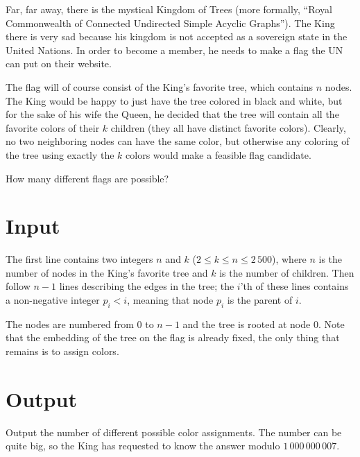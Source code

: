 
%
\noindent
Far, far away, there is the mystical Kingdom of Trees (more formally, ``Royal Commonwealth of Connected Undirected Simple Acyclic Graphs''). The King there is very sad because his kingdom is not accepted as a sovereign state in the United Nations. In order to become a member, he needs to make a flag the UN can put on their website.

The flag will of course consist of the King's favorite tree, which contains $n$ nodes. The King would be happy to just have the tree colored in black and white, but for the sake of his wife the Queen, he decided that the tree will contain all the favorite colors of their $k$ children (they all have distinct favorite colors). Clearly, no two neighboring nodes can have the same color, but otherwise any coloring of the tree using exactly the $k$ colors would make a feasible flag candidate.

How many different flags are possible?

\section*{Input}

The first line contains two integers $n$ and $k$ ($2 \le k \le n \le 2\,500$), where $n$ is the number of nodes in the King's favorite tree and $k$ is the number of children. Then follow $n-1$ lines describing the edges in the tree; the $i$'th of these lines contains a non-negative integer $p_i < i$, meaning that node $p_i$ is the parent of $i$.

The nodes are numbered from $0$ to $n-1$ and the tree is rooted at node $0$. Note that the embedding of the tree on the flag is already fixed, the only thing that remains is to assign colors.


\section*{Output}
Output the number of different possible color assignments. The number can be quite big, so the King has requested to know the answer modulo $1\,000\,000\,007$.
